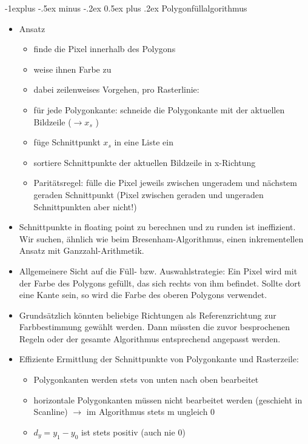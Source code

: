\documentclass[10pt,landscape]{article}
\makeatletter
\renewcommand{\subsection}{\@startsection{subsection}{2}{0mm}%
                                {-1explus -.5ex minus -.2ex}%
                                {0.5ex plus .2ex}%
                                {\normalfont\normalsize\bfseries}}
\makeatother
\begin{document}
\begin{multicols}{3}
\subsection{ Polygonfüllalgorithmus}
\begin{itemize}
  \item Ansatz
        \begin{itemize}
          \item finde die Pixel innerhalb des Polygons
          \item weise ihnen Farbe zu
          \item dabei zeilenweises Vorgehen, pro Rasterlinie:
          \item für jede Polygonkante: schneide die Polygonkante mit der aktuellen Bildzeile ($\rightarrow x_s$ )
          \item füge Schnittpunkt $x_s$ in eine Liste ein
          \item sortiere Schnittpunkte der aktuellen Bildzeile in x-Richtung
          \item Paritätsregel: fülle die Pixel jeweils zwischen ungeradem und nächstem geraden Schnittpunkt (Pixel zwischen geraden und ungeraden Schnittpunkten aber nicht!)
        \end{itemize}
  \item Schnittpunkte in floating point zu berechnen und zu runden ist ineffizient. Wir suchen, ähnlich wie beim Bresenham-Algorithmus, einen inkrementellen Ansatz mit Ganzzahl-Arithmetik.
  \item Allgemeinere Sicht auf die Füll- bzw. Auswahlstrategie: Ein Pixel wird mit der Farbe des Polygons gefüllt, das sich rechts von ihm befindet. Sollte dort eine Kante sein, so wird die Farbe des oberen Polygons verwendet.
  \item Grundsätzlich könnten beliebige Richtungen als Referenzrichtung zur Farbbestimmung gewählt werden. Dann müssten die zuvor besprochenen Regeln oder der gesamte Algorithmus entsprechend angepasst werden.
  \item Effiziente Ermittlung der Schnittpunkte von Polygonkante und Rasterzeile:
        \begin{itemize}
          \item Polygonkanten werden stets von unten nach oben bearbeitet
          \item horizontale Polygonkanten müssen nicht bearbeitet werden (geschieht in Scanline) $\rightarrow$ im Algorithmus stets m ungleich 0
          \item $d_y = y_1 - y_0$ ist stets positiv (auch nie 0)

\end{itemize}
\end{itemize}
\end{multicols}
\end{document}
